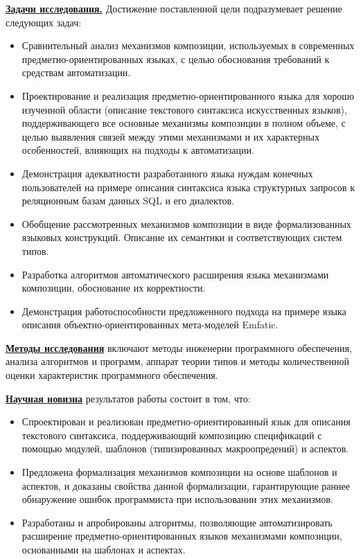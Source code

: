 \documentclass[12pt,a4paper]{article}
\theoremstyle{definition}
\theoremstyle{plain}
\newcommand{\afsubsection}[1]{\par \textbf{\underline{#1}}}
\begin{document}
\afsubsection{Задачи исследования.} Достижение поставленной цели подразумевает решение следующих задач:
\begin{itemize}
\item Сравнительный анализ механизмов композиции, используемых в современных предметно-ориентированных языках, с целью обоснования требований к средствам автоматизации.
\item Проектирование и реализация предметно-ориентированного языка для хорошо изученной области (описание текстового синтаксиса искусственных языков), поддерживающего все основные механизмы композиции в полном объеме, с целью выявления связей между этими механизмами и их характерных особенностей, влияющих на подходы к автоматизации.
\item Демонстрация адекватности разработанного языка нуждам конечных пользователей на примере описания синтаксиса языка структурных запросов к реляционным базам данных SQL и его диалектов.
\item Обобщение рассмотренных механизмов композиции в виде формализованных языковых конструкций. Описание их семантики и соответствующих систем типов.
\item Разработка алгоритмов автоматического расширения языка механизмами композиции, обоснование их корректности.
\item Демонстрация работоспособности предложенного подхода на примере языка описания объектно-ориентированных мета-моделей Emfatic.
\end{itemize}

\afsubsection{Методы исследования} включают методы инженерии программного обеспечения, анализа алгоритмов и программ, аппарат теории типов и методы количественной оценки характеристик программного обеспечения.

\afsubsection{Научная новизна} результатов работы состоит в том, что:
\begin{itemize}
\item Спроектирован и реализован предметно-ориентированный язык для описания текстового синтаксиса, поддерживающий композицию спецификаций с помощью модулей, шаблонов (типизированных макроопредений) и аспектов.
\item Предложена формализация механизмов композиции на основе шаблонов и аспектов, и доказаны свойства данной формализации, гарантирующие раннее обнаружение ошибок программиста при использовании этих механизмов.
\item Разработаны и апробированы алгоритмы, позволяющие автоматизировать расширение предметно-ориентированных языков механизмами композиции, основанными на шаблонах и аспектах.
\end{itemize}
\end{document}
